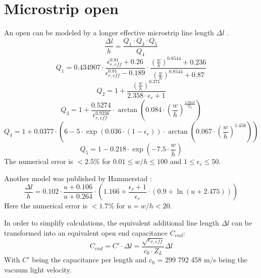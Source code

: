 \documentclass[10pt]{report}
\begin{document}
\section{Microstrip open}
An open can be modeled by a longer effective microstrip line
length $\Delta l$ \cite{Kirschning7}.
\begin{equation}
\frac{\Delta l}{h} = \frac{Q_1\cdot Q_3\cdot Q_5}{Q_4}
\end{equation}
\begin{equation}
Q_1 = 0.434907\cdot \frac{\epsilon_{r,eff}^{0.81}+0.26}{\epsilon_{r,eff}^{0.81}-0.189}\cdot
      \frac{\left( \frac{w}{h} \right)^{0.8544} + 0.236}{\left( \frac{w}{h} \right)^{0.8544} + 0.87}
\end{equation}
\begin{equation}
Q_2 = 1 + \frac{\left( \frac{w}{h} \right) ^{0.371}}{2.358\cdot \epsilon_r + 1}
\end{equation}
\begin{equation}
Q_3 = 1 + \frac{0.5274}{\epsilon_{r,eff}^{0.9236}} \cdot
      \arctan\left( 0.084\cdot\left( \frac{w}{h} \right) ^\frac{1.9413}{Q_2} \right)
\end{equation}
\begin{equation}
Q_4 = 1 + 0.0377\cdot \left( 6-5\cdot\exp(0.036\cdot(1-\epsilon_r))\cdot
      \arctan\left( 0.067\cdot\left(\frac{w}{h}\right)^{1.456} \right) \right)
\end{equation}
\begin{equation}
Q_5 = 1 - 0.218\cdot \exp\left( -7.5\cdot\frac{w}{h} \right)
\end{equation}
The numerical error is $<2.5$\% for $0.01\le w/h \le 100$ and $1\le\epsilon_r\le 50$.

\addvspace{12pt}

Another model was published by Hammerstad \cite{Hammerstad2}:
\begin{equation}
\frac{\Delta l}{h} = 0.102\cdot \frac{u+0.106}{u+0.264} \cdot
    \left( 1.166 + \frac{\epsilon_r+1}{\epsilon_r}\cdot \left(0.9+\ln(u+2.475) \right) \right)
\end{equation}
Here the numerical error is $<1.7$\% for $u = w/h < 20$.

\addvspace{12pt}

In order to simplify calculations,
the equivalent additional line length $\Delta l$ can be transformed
into an equivalent open end capacitance $C_{end}$:
\begin{equation}
\label{eqn:Cend}
C_{end} = C'\cdot \Delta l = \frac{\sqrt{\epsilon_{r,eff}}}{c_0\cdot Z_L} \Delta l
\end{equation}
With $C'$ being the capacitance per length and $c_0$ = 299 792 458 m/s
being the vacuum light velocity.
\end{document}
